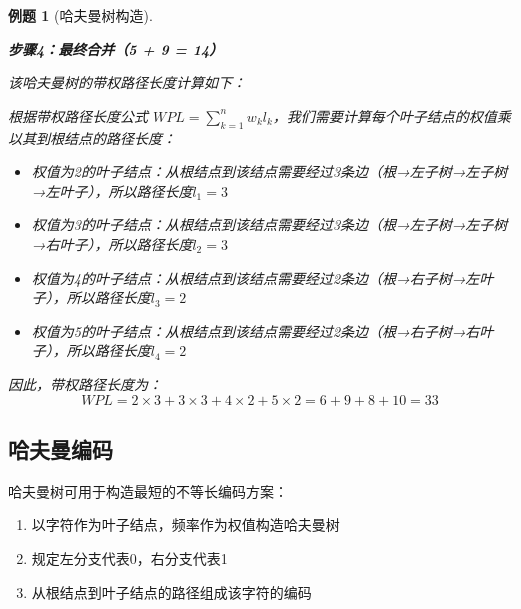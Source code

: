 \documentclass[12pt,a4paper]{amsart}
\newtheorem{example}{例题}[section]
\begin{document}
\begin{example}[哈夫曼树构造]
\begin{center}
\vspace{0.8cm}

\textbf{步骤4：最终合并（5 + 9 = 14）}

\end{center}
该哈夫曼树的带权路径长度计算如下：

根据带权路径长度公式 $WPL = \sum_{k=1}^{n} w_k l_k$，我们需要计算每个叶子结点的权值乘以其到根结点的路径长度：

\begin{itemize}
\item 权值为2的叶子结点：从根结点到该结点需要经过3条边（根→左子树→左子树→左叶子），所以路径长度$l_1 = 3$
\item 权值为3的叶子结点：从根结点到该结点需要经过3条边（根→左子树→左子树→右叶子），所以路径长度$l_2 = 3$  
\item 权值为4的叶子结点：从根结点到该结点需要经过2条边（根→右子树→左叶子），所以路径长度$l_3 = 2$
\item 权值为5的叶子结点：从根结点到该结点需要经过2条边（根→右子树→右叶子），所以路径长度$l_4 = 2$
\end{itemize}

因此，带权路径长度为：
$$WPL = 2 \times 3 + 3 \times 3 + 4 \times 2 + 5 \times 2 = 6 + 9 + 8 + 10 = 33$$
\end{example}

\subsection{哈夫曼编码}

哈夫曼树可用于构造最短的不等长编码方案：
\begin{enumerate}
\item 以字符作为叶子结点，频率作为权值构造哈夫曼树
\item 规定左分支代表0，右分支代表1
\item 从根结点到叶子结点的路径组成该字符的编码
\end{enumerate}
\end{document}
